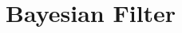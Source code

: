 \documentclass[../../Bayesian_Inference.tex]{subfiles}
\begin{document}
\chapter{Bayesian Filter}



\end{document}
